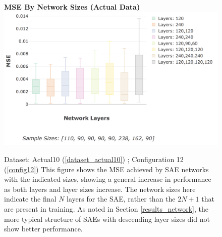 \documentclass[a4paper,11pt,oneside]{article}
\theoremstyle{plain}
\theoremstyle{definition}
\begin{document}
	\begin{figure}[H]
		\centering 
		\textbf{MSE By Network Sizes (Actual Data)}
		\includegraphics[scale=0.4]{images/results/8_appendix/actual_sae_mse_box.png} 
		\caption[MSE By Network Sizes (Actual Data)]{Dataset: Actual10 (\ref{dataset_actual10}) ; Configuration 12 (\ref{config12})
			\newline This figure shows the MSE achieved by SAE networks with the indicated sizes, showing a general increase in performance as both layers and layer sizes increase. The network sizes here indicate the final $N$ layers for the SAE, rather than the $2N + 1$ that are present in training. As noted in Section \ref{results_network}, the more typical structure of SAEs with descending layer sizes did not show better performance.}
		\label{figure-actual_sae_mse_box}
	\end{figure}
	
\end{document}
